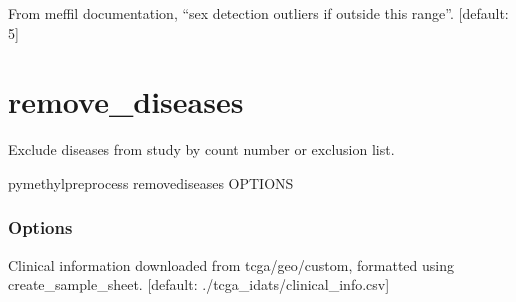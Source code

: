 \documentclass[letterpaper,10pt,english]{sphinxmanual}
\begin{document}
\begin{fulllineitems}
\label{\detokenize{index:cmdoption-pymethyl-preprocess-preprocess-pipeline-sd}}
From meffil documentation, “sex detection outliers if outside this range”.  {[}default: 5{]}

\end{fulllineitems}



\section{remove\_diseases}
\label{\detokenize{index:pymethyl-preprocess-remove-diseases}}
Exclude diseases from study by count number or exclusion list.

\begin{sphinxVerbatim}[commandchars=\\\{\}]
pymethyl\PYGZhy{}preprocess remove\PYGZus{}diseases \PYG{o}{[}OPTIONS\PYG{o}{]}
\end{sphinxVerbatim}
\subsubsection*{Options}

\begin{fulllineitems}
\label{\detokenize{index:cmdoption-pymethyl-preprocess-remove-diseases-is}}
Clinical information downloaded from tcga/geo/custom, formatted using create\_sample\_sheet.  {[}default: ./tcga\_idats/clinical\_info.csv{]}

\end{fulllineitems}
\end{document}
